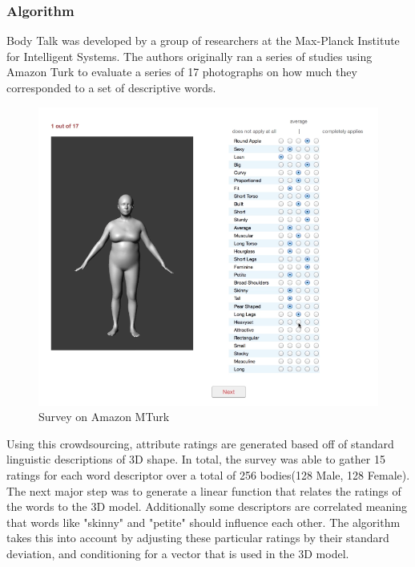 \documentclass[journal]{vgtc}                %
\begin{document}
\subsubsection{Algorithm}
\noindent Body Talk was developed by a group of researchers at the Max-Planck Institute for Intelligent Systems. The authors originally ran a series
of studies using Amazon Turk to evaluate a series of 17 photographs on how much they corresponded to a set of descriptive words. \
\begin{figure}[!htb]
	\includegraphics[width=\columnwidth]{survey}
	\caption{Survey on Amazon MTurk}
\end{figure}
Using this crowdsourcing, attribute ratings are generated based off of standard linguistic descriptions of 3D shape. In total, the 
survey was able to gather 15 ratings for each word descriptor over a total of 256 bodies(128 Male, 128 Female). The next major step was 
to generate a linear function that relates the ratings of the words to the 3D model. Additionally some descriptors are correlated 
meaning that words like "skinny" and "petite" should influence each other. The algorithm takes this into account by adjusting these 
particular ratings by their standard deviation, and conditioning for a vector that is used in the 3D model.
\end{document}
